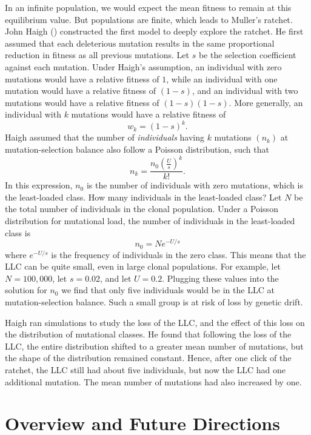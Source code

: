 \documentclass[
  american,
  letterpaper,
]{book}
\begin{document}
In an infinite population, we would expect the mean fitness to remain at
this equilibrium value. But populations are finite, which leads to
Muller's ratchet. John Haigh ()
constructed the first model to deeply explore the ratchet. He first
assumed that each deleterious mutation results in the same proportional
reduction in fitness as all previous mutations. Let \(s\) be the
selection coefficient against each mutation. Under Haigh's assumption,
an individual with zero mutations would have a relative fitness of
\(1\), while an individual with one mutation would have a relative
fitness of \((1-s)\), and an individual with two mutations would have a
relative fitness of \((1-s)(1-s)\). More generally, an individual with
\(k\) mutations would have a relative fitness of \[w_k=(1-s)^k.\] Haigh
assumed that the number of \emph{individuals} having \(k\) mutations
\((n_k)\) at mutation-selection balance also follow a Poisson
distribution, such that
\[n_k=\frac{n_0\left(\frac{U}{s}\right)^k}{k!}.\] In this expression,
\(n_0\) is the number of individuals with zero mutations, which is the
least-loaded class. How many individuals in the least-loaded class? Let
\(N\) be the total number of individuals in the clonal population. Under
a Poisson distribution for mutational load, the number of individuals in
the least-loaded class is \[n_0=Ne^{-U/s}\] where \(e^{-U/s}\) is the
frequency of individuals in the zero class. This means that the LLC can
be quite small, even in large clonal populations. For example, let
\(N = 100,000\), let \(s = 0.02\), and let \(U = 0.2\). Plugging these
values into the solution for \(n_0\) we find that only five individuals
would be in the LLC at mutation-selection balance. Such a small group is
at risk of loss by genetic drift.

Haigh ran simulations to study the loss of the LLC, and the effect of
this loss on the distribution of mutational classes. He found that
following the loss of the LLC, the entire distribution shifted to a
greater mean number of mutations, but the shape of the distribution
remained constant. Hence, after one click of the ratchet, the LLC still
had about five individuals, but now the LLC had one additional mutation.
The mean number of mutations had also increased by one.


\chapter{Overview and Future
Directions}\label{overview-and-future-directions}
\end{document}
